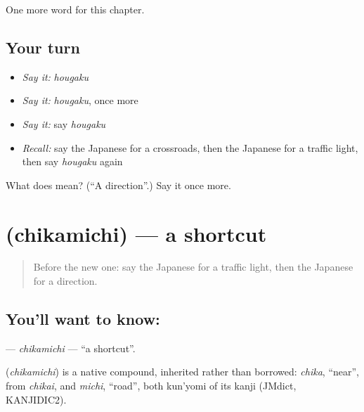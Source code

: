 \begin{grammarlens}[title={What you've built}]
One more word for this chapter.
\end{grammarlens}

\subsection*{Your turn}
\begin{itemize}
\raggedright
  \item \emph{Say it:} \emph{hougaku}
  \item \emph{Say it:} \emph{hougaku}, once more
  \item \emph{Say it:} say \emph{hougaku}
  \item \emph{Recall:} say the Japanese for a crossroads, then the Japanese for a traffic light, then say \emph{hougaku} again
\end{itemize}

\begin{tcolorbox}[breakable,colback=teal!4,colframe=teal!35!black,title={Before you move on}]
What does  mean? (\textquotedblleft{}A direction\textquotedblright{}.) Say it once more.
\end{tcolorbox}
\section[\texorpdfstring{\ja{ちかみち} (chikamichi)}{ちかみち (chikamichi)}]{ (chikamichi) — a shortcut}

\label{lesson:JA-C80-chikamichi}



\begin{quote}
Before the new one: say the Japanese for a traffic light, then the Japanese for a direction.
\end{quote}

\subsection*{You'll want to know: }
\textbf{} — \emph{chikamichi} — \textquotedblleft{}a shortcut\textquotedblright{}.

\begin{cousinweb}
\textbf{} (\emph{chikamichi}) is a native compound, inherited rather than borrowed: \emph{chika}, \textquotedblleft{}near\textquotedblright{}, from \emph{chikai}, and \emph{michi}, \textquotedblleft{}road\textquotedblright{}, both kun'yomi of its kanji (JMdict, KANJIDIC2).
\end{cousinweb}

